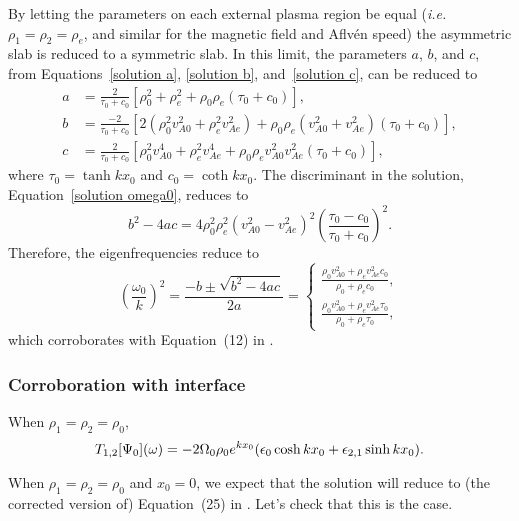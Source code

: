 \documentclass[12pt]{../style-files/ociamthesis}
\begin{document}
By letting the parameters on each external plasma region be equal (\textit{i.e.} $\rho_1 = \rho_2 = \rho_e$, and similar for the magnetic field and Aflv\'{e}n speed) the asymmetric slab is reduced to a symmetric slab. In this limit, the parameters $a$, $b$, and $c$, from Equations~\eqref{solution a}, \eqref{solution b}, and~\eqref{solution c}, can be reduced to
\begin{align}
a &= \frac{2}{\tau_0 + c_0} \left[ \rho_0^2 + \rho_e^2 + \rho_0\rho_e(\tau_0 + c_0) \right], \\
b &= \frac{-2}{\tau_0 + c_0} \left[ 2(\rho_0^2v_{A0}^2 + \rho_e^2v_{Ae}^2) + \rho_0\rho_e(v_{A0}^2 + v_{Ae}^2)(\tau_0 + c_0) \right], \\
c &= \frac{2}{\tau_0 + c_0} \left[ \rho_0^2v_{A0}^4 + \rho_e^2v_{Ae}^4 + \rho_0\rho_ev_{A0}^2v_{Ae}^2(\tau_0 + c_0) \right],
\end{align}
where $\tau_0 = \tanh{kx_0}$ and $c_0 = \coth{kx_0}$. The discriminant in the solution, Equation~\eqref{solution omega0}, reduces to
\begin{equation}
b^2 - 4ac = 4\rho_0^2\rho_e^2(v_{A0}^2 - v_{Ae}^2)^2 \left(\frac{\tau_0 - c_0}{\tau_0 + c_0}\right)^2. 
\end{equation}
Therefore, the eigenfrequencies reduce to
\begin{equation}
\left(\frac{\omega_0}{k}\right)^2 = \frac{-b \pm \sqrt{b^2 - 4ac}}{2a} =
\begin{cases}
\frac{\rho_0v_{A0}^2 + \rho_ev_{Ae}^2c_0}{\rho_0 + \rho_ec_0}, \\
\frac{\rho_0v_{A0}^2 + \rho_ev_{Ae}^2\tau_0}{\rho_0 + \rho_e\tau_0},
\end{cases}
\end{equation}
which corroborates with Equation~(12) in \cite{rob81b}.


\subsubsection{Corroboration with interface}
When $\rho_1 = \rho_2 = \rho_0$,
\begin{equation}
T_{1,2}[\Psi_0](\omega) = -2\Omega_0\rho_0 e^{kx_0} (\epsilon_0 \cosh{kx_0} + \epsilon_{2,1}\sinh{kx_0}).
\end{equation}

When $\rho_1 = \rho_2 = \rho_0$ and $x_0 = 0$, we expect that the solution will reduce to (the corrected version of) Equation~(25) in \cite{rae_etal81}. Let's check that this is the case.
\end{document}
